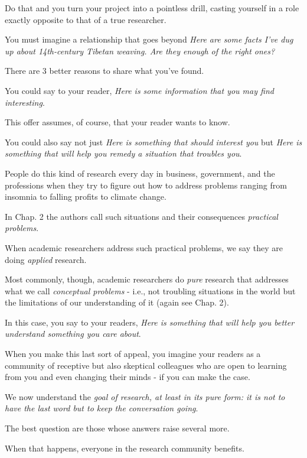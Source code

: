 \documentclass[oneside]{book}
\numberwithin{equation}{section}
\begin{document}
Do that and you turn your project into a pointless drill, casting yourself in a role exactly opposite to that of a true researcher.


You must imagine a relationship that goes beyond \textit{Here are some facts I've dug up about 14th-century Tibetan weaving. Are they enough of the right ones?}

%
There are 3 better reasons to share what you've found.

You could say to your reader, \textit{Here is some information that you may find interesting}.

This offer assumes, of course, that your reader wants to know.

You could also say not just \textit{Here is something that should interest you} but \textit{Here is something that will help you remedy a situation that troubles you}.

People do this kind of research every day in business, government, and the professions when they try to figure out how to address problems ranging from insomnia to falling profits to climate change.

In Chap. 2 the authors call such situations and their consequences \textit{practical problems}.

When academic researchers address such practical problems, we say they are doing \textit{applied} research.

Most commonly, though, academic researchers do \textit{pure} research that addresses what we call \textit{conceptual problems} - i.e., not troubling situations in the world but the limitations of our understanding of it (again see Chap. 2).

In this case, you say to your readers, \textit{Here is something that will help you better understand something you care about}.

When you make this last sort of appeal, you imagine your readers as a community of receptive but also skeptical colleagues who are open to learning from you and even changing their minds - if you can make the case.

%
We now understand the \textit{goal of research, at least in its pure form: it is not to have the last word but to keep the conversation going}.

The best question are those whose answers raise several more.

When that happens, everyone in the research community benefits.
\end{document}
